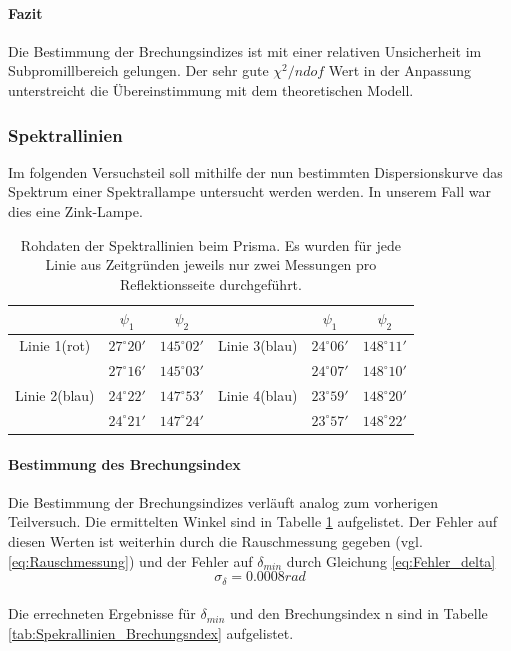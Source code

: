 \documentclass[12pt,a4paper]{article}
\begin{document}
\paragraph{Fazit}
Die Bestimmung der Brechungsindizes ist mit einer relativen Unsicherheit im Subpromillbereich gelungen. Der sehr gute $\chi^2/ndof$ Wert in der Anpassung unterstreicht die Übereinstimmung mit dem theoretischen Modell.

\subsubsection{Spektrallinien}
Im folgenden Versuchsteil soll mithilfe der nun bestimmten Dispersionskurve das Spektrum einer Spektrallampe untersucht werden werden. In unserem Fall war dies eine Zink-Lampe.
\begin{table}
\begin{tabular}{|c|c|c||c|c|c|}
\hline 
 & $\psi_1$ & $\psi_2$ & & $\psi_1$ & $\psi_2$ \\ 
\hline 
Linie 1(rot) & $27^\circ 20'$ & $145^\circ 02'$ & Linie 3(blau) & $24^\circ 06'$ & $148^\circ 11'$\\ 
\hline 
 & $27^\circ 16'$ & $145^\circ 03'$& & $24^\circ 07'$ & $148^\circ 10'$\\
\hline
\hline 
\hline 
Linie 2(blau) & $24^\circ 22'$ & $147^\circ 53'$ & Linie 4(blau) & $23^\circ 59'$ & $148^\circ 20'$\\ 
\hline 
 & $24^\circ 21'$ & $147^\circ 24'$&  & $23^\circ 57'$ & $148^\circ 22'$\\ 
\hline 
\end{tabular} 
\caption{Rohdaten der Spektrallinien beim Prisma. Es wurden für jede Linie aus Zeitgründen jeweils nur zwei Messungen pro Reflektionsseite durchgeführt.}
\label{tab:Spektrallinien_rohdaten}
\end{table}

\paragraph{Bestimmung des Brechungsindex}
Die Bestimmung der Brechungsindizes verläuft analog zum vorherigen Teilversuch. Die ermittelten Winkel sind in Tabelle \ref{tab:Spektrallinien_rohdaten} aufgelistet.
Der Fehler auf diesen Werten ist weiterhin durch die Rauschmessung gegeben (vgl. \ref{eq:Rauschmessung})
und der Fehler auf $\delta_{min}$ durch Gleichung \ref{eq:Fehler_delta}
\begin{equation}
\sigma_{\delta} = 0.0008 rad
\end{equation}\\
Die errechneten Ergebnisse für $\delta_{min}$ und den Brechungsindex n sind in Tabelle \ref{tab:Spekrallinien_Brechungsndex} aufgelistet.
\end{document}
